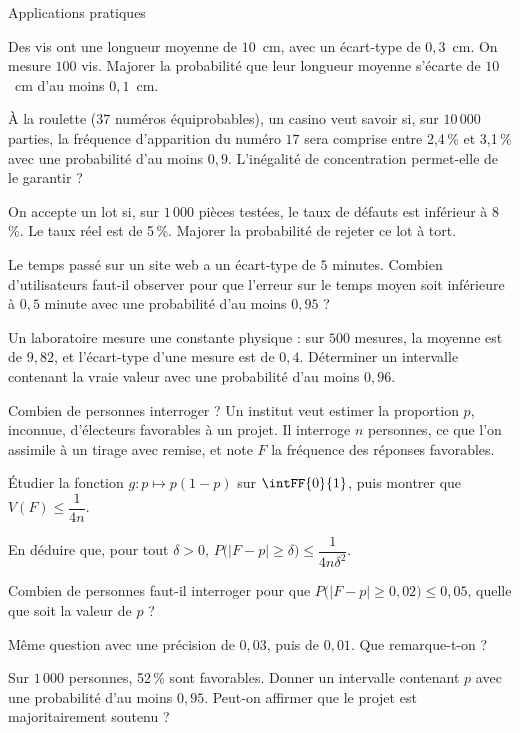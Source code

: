 
\begin{exercice}[3]{Applications pratiques}
\begin{questions}
  \item Des vis ont une longueur moyenne de $10$~cm, avec un écart-type de $0{,}3$~cm. On mesure $100$ vis. Majorer la probabilité que
    leur longueur moyenne s'écarte de $10$~cm d'au moins $0{,}1$~cm.
  \item À la roulette ($37$ numéros équiprobables), un casino veut savoir si, sur $10\,000$ parties, la fréquence d'apparition du
    numéro $17$ sera comprise entre 2,4\,\% et 3,1\,\% avec une probabilité d'au moins $0{,}9$. L'inégalité de concentration
    permet-elle de le garantir ?
  \item On accepte un lot si, sur $1\,000$ pièces testées, le taux de défauts est inférieur à 8\,\%. Le taux réel est de 5\,\%. Majorer
    la probabilité de rejeter ce lot à tort.
  \item Le temps passé sur un site web a un écart-type de $5$ minutes. Combien d'utilisateurs faut-il observer pour que l'erreur sur
    le temps moyen soit inférieure à $0{,}5$ minute avec une probabilité d'au moins $0{,}95$ ?
  \item Un laboratoire mesure une constante physique : sur $500$ mesures, la moyenne est de $9{,}82$, et l'écart-type d'une mesure
    est de $0{,}4$. Déterminer un intervalle contenant la vraie valeur avec une probabilité d'au moins $0{,}96$.
\end{questions}
\end{exercice}

\begin{exercice}[3]{Combien de personnes interroger ?}
Un institut veut estimer la proportion $p$, inconnue, d'électeurs favorables à un projet. Il interroge $n$ personnes, ce que l'on
assimile à un tirage avec remise, et note $F$ la fréquence des réponses favorables.
\begin{questions}
  \item Étudier la fonction $g:p\mapsto p(1-p)$ sur $\intFF{0}{1}$, puis montrer que $V(F)\leq\dfrac{1}{4n}$.
  \item En déduire que, pour tout $\delta>0$, $P\big(|F-p|\geq\delta\big)\leq\dfrac{1}{4n\delta^{2}}$.
  \item Combien de personnes faut-il interroger pour que $P\big(|F-p|\geq0{,}02\big)\leq0{,}05$, quelle que soit la valeur de $p$ ?
  \item Même question avec une précision de $0{,}03$, puis de $0{,}01$. Que remarque-t-on ?
  \item Sur $1\,000$ personnes, 52\,\% sont favorables. Donner un intervalle contenant $p$ avec une probabilité d'au moins $0{,}95$.
    Peut-on affirmer que le projet est majoritairement soutenu ?
\end{questions}
\end{exercice}

